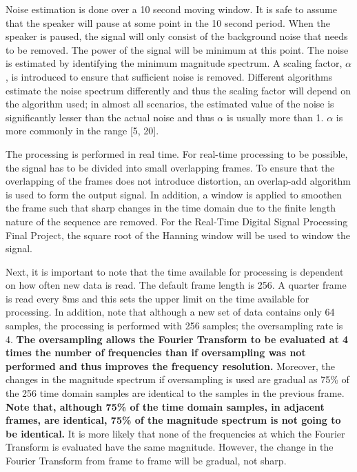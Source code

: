 \documentclass[a4paper,pra,twocolumn,10pt,aps,longbibliography,nobalancelastpage]{revtex4-1}
\begin{document}
Noise estimation is done over a 10 second moving window. It is safe to assume that the speaker will pause at some point in the 10 second period. When the speaker is paused, the signal will only consist of the background noise that needs to be removed. The power of the signal will be minimum at this point. The noise is estimated by identifying the minimum  magnitude spectrum. A scaling factor, $\alpha$, is introduced to ensure that sufficient noise is removed. Different algorithms estimate the noise spectrum differently and thus the scaling factor will depend on the algorithm used; in almost all scenarios, the estimated value of the noise is significantly lesser than the actual noise and thus $\alpha$ is usually more than 1. $\alpha$ is more commonly in the range [5, 20].

The processing is performed in real time. For real-time processing to be possible, the signal has to be divided into small overlapping frames. To ensure that the overlapping of the frames does not introduce distortion, an overlap-add algorithm is used to form the output signal. In addition, a window is applied to smoothen the frame such that sharp changes in the time domain due to the finite length nature of the sequence are removed. For the Real-Time Digital Signal Processing Final Project, the square root of the Hanning window will be used to window the signal.

Next, it is important to note that the time available for processing is dependent on how often new data is read. The default frame length is 256. A quarter frame is read every 8ms and this sets the upper limit on the time available for processing. In addition, note that although a new set of data contains only 64 samples, the processing is performed with 256 samples; the oversampling rate is 4.\textbf{ The oversampling allows the Fourier Transform to be evaluated at 4 times the number of frequencies than if oversampling was not performed and thus improves the frequency resolution.} Moreover, the changes in the magnitude spectrum if oversampling is used are gradual as 75\% of the 256 time domain samples are identical to the samples in the previous frame. \textbf{Note that, although 75\% of the time domain samples, in adjacent frames, are identical, 75\% of the magnitude spectrum is not going to be identical.} It is more likely that none of the frequencies at which the Fourier Transform is evaluated have the same magnitude. However, the change in the Fourier Transform from frame to frame will be gradual, not sharp.
\end{document}
